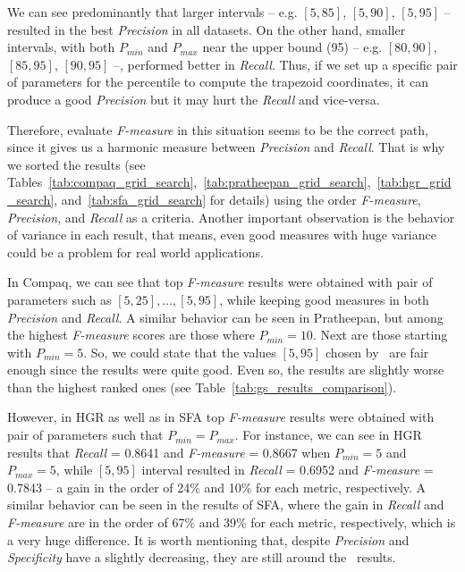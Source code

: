We can see predominantly that larger intervals -- e.g. $[5, 85]$, $[5, 90]$, $[5, 95]$ -- resulted in the best \emph{Precision} in all datasets. On the other hand, smaller intervals, with both $P_{min}$ and $P_{max}$ near the upper bound (95) -- e.g. $[80, 90]$, $[85, 95]$, $[90 ,95]$ --, performed better in \emph{Recall}. Thus, if we set up a specific pair of parameters for the percentile to compute the trapezoid coordinates, it can produce a good \emph{Precision} but it may hurt the \emph{Recall} and vice-versa.

Therefore, evaluate \emph{F-measure} in this situation seems to be the correct path, since it gives us a harmonic measure between \emph{Precision} and \emph{Recall}. That is why we sorted the results (see Tables~\ref{tab:compaq_grid_search},~\ref{tab:pratheepan_grid_search},~\ref{tab:hgr_grid_search}, and~\ref{tab:sfa_grid_search} for details) using the order \emph{F-measure}, \emph{Precision}, and \emph{Recall} as a criteria. Another important observation is the behavior of variance in each result, that means, even good measures with huge variance could be a problem for real world applications.

In Compaq, we can see that top \emph{F-measure} results were obtained with pair of parameters such as $[5, 25], \ldots, [5, 95]$, while keeping good measures in both \emph{Precision} and \emph{Recall}. A similar behavior can be seen in Pratheepan, but among the highest \emph{F-measure} scores are those where $P_{min} = 10$. Next are those starting with $P_{min} = 5$. So, we could state that the values $[5, 95]$ chosen by~\citet{brancati:17} are fair enough since the results were quite good. Even so, the results are slightly worse than the highest ranked ones (see Table~\ref{tab:gs_results_comparison}).

However, in HGR as well as in SFA top \emph{F-measure} results were obtained with pair of parameters such that $P_{min} = P_{max}$. For instance, we can see in HGR results that \emph{Recall} = 0.8641 and \emph{F-measure} = 0.8667 when $P_{min} = 5$ and $P_{max} = 5$, while $[5, 95]$ interval resulted in \emph{Recall} = 0.6952 and \emph{F-measure} = 0.7843 -- a gain in the order of 24\% and 10\% for each metric, respectively. A similar behavior can be seen in the results of SFA, where the gain in \emph{Recall} and \emph{F-measure} are in the order of 67\% and 39\% for each metric, respectively, which is a very huge difference. It is worth mentioning that, despite \emph{Precision} and \emph{Specificity} have a slightly decreasing, they are still around the~\citet{brancati:17} results.



